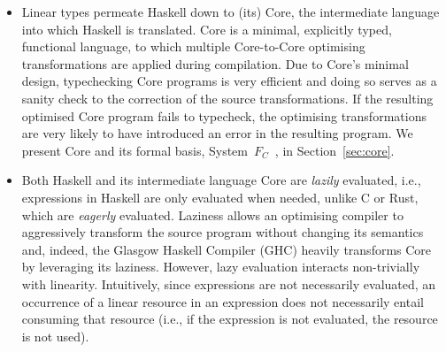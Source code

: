 \documentclass[acmsmall, screen, review]{acmart}
\begin{document}
\begin{itemize}

    \item Linear types permeate Haskell down to (its) Core, the
        intermediate language into which Haskell is
        translated. Core is a minimal, explicitly typed,
        functional language, to which multiple
        Core-to-Core optimising transformations are
        applied during compilation. Due to Core's minimal design, typechecking
        Core programs is very efficient and doing so serves as a sanity check to the
        correction of the source transformations. If the resulting optimised
        Core program fails to typecheck, the optimising
        transformations are very likely to have introduced an error
        in the resulting program. We present Core and its formal
        basis, System~$F_C$~\cite{cite:systemfc}, in Section~\ref{sec:core}.

    \item Both Haskell and its intermediate language Core are \emph{lazily}
        evaluated, i.e., expressions in Haskell are only evaluated when needed,
        unlike C or Rust, which are \emph{eagerly} evaluated.
        Laziness allows an optimising compiler to aggressively transform the source
        program without changing its semantics and, indeed, the Glasgow Haskell
        Compiler (GHC) heavily transforms Core by leveraging its laziness.
        However, lazy evaluation interacts non-trivially with linearity.
        Intuitively, since expressions are not necessarily evaluated, an
        occurrence of a linear resource in an expression does not necessarily
        entail consuming that resource (i.e., if the expression is not evaluated,
        the resource is not used).


\end{itemize}
\end{document}
